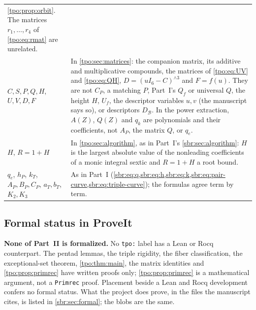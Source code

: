 \documentclass[11pt,letterpaper]{article}
\numberwithin{equation}{section}
\theoremstyle{definition}
\theoremstyle{remark}
\newcommand{\src}[1]{\texttt{\nolinkurl{#1}}}
\begin{document}
\begin{center}
\begin{longtable}{@{}>{\raggedright\arraybackslash}p{}
 >{\raggedright\arraybackslash}p{}@{}}
\cref{tpo:prop:orbit}. The matrices $r_1,\ldots,r_4$ of \eqref{tpo:eq:rmat}
are unrelated.\\[3pt]
$C,S,P,Q,H$, $U,V,D,F$ & In \cref{tpo:sec:matrices}: the companion matrix,
its additive and multiplicative compounds, the matrices of
\eqref{tpo:eq:UV} and \eqref{tpo:eq:QH}, $D=(uI_6-C)^{\wedge3}$ and
$F=f(u)$. They are not $C_P$, a matching $P$, Part~I's $Q_f$ or universal
$Q$, the height $H$, $U_f$, the descriptor variables $u,v$ (the manuscript
says so), or descriptors $D_{\mathcal B}$. In the power extraction,
$A(Z)$, $Q(Z)$ and $q_k$ are polynomials and their coefficients, not $A_P$,
the matrix $Q$, or $q_e$.\\[3pt]
$H$, $R=1+H$ & In \cref{tpo:sec:algorithm}, as in Part~I's
\cref{sbr:sec:algorithm}: $H$ is the largest absolute value of the
nonleading coefficients of a monic integral sextic and $R=1+H$ a root
bound.\\[3pt]
$q_e$, $h_P$, $k_T$, $A_P,B_P,C_P$, $a_T,b_T$, $K_2,K_3$ & As in Part~I
(\cref{sbr:eq:q,sbr:eq:h,sbr:eq:k,sbr:eq:pair-curve,sbr:eq:triple-curve});
the formulas agree term by term.\\
\end{longtable}
\end{center}

\subsection{Formal status in ProveIt}
\label{tpo:sec:formal}

\textbf{None of Part~II is formalized.} No \src{tpo:} label has a Lean or
Rocq counterpart. The pentad lemmas, the triple rigidity, the fiber
classification, the exceptional-set theorem, \cref{tpo:thm:main}, the
matrix identities and \cref{tpo:prop:primrec} have written proofs only;
\cref{tpo:prop:primrec} is a mathematical argument, not a \src{Primrec}
proof. Placement beside a Lean and Rocq development confers no formal
status. What the project does prove, in the files the manuscript cites, is
listed in \cref{sbr:sec:formal}; the blobs are the same.
\end{document}
